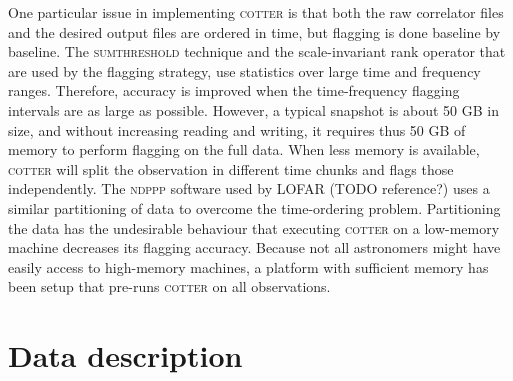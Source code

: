 \documentclass[useAMS,usenatbib]{mn2e}
\begin{document}
One particular issue in implementing \textsc{cotter} is that both the raw correlator files and the desired output files are ordered in time, but flagging is done baseline by baseline. The \textsc{sumthreshold} technique and the scale-invariant rank operator that are used by the flagging strategy, use statistics over large time and frequency ranges. Therefore, accuracy is improved when the time-frequency flagging intervals are as large as possible. However, a typical snapshot is about 50 GB in size, and without increasing reading and writing, it requires thus 50 GB of memory to perform flagging on the full data. When less memory is available, \textsc{cotter} will split the observation in different time chunks and flags those independently. The \textsc{ndppp} software used by LOFAR (TODO reference?) uses a similar partitioning of data to overcome the time-ordering problem. Partitioning the data has the undesirable behaviour that executing \textsc{cotter} on a low-memory machine decreases its flagging accuracy. Because not all astronomers might have easily access to high-memory machines, a platform with sufficient memory has been setup that pre-runs \textsc{cotter} on all observations.

\section{Data description}
\end{document}
